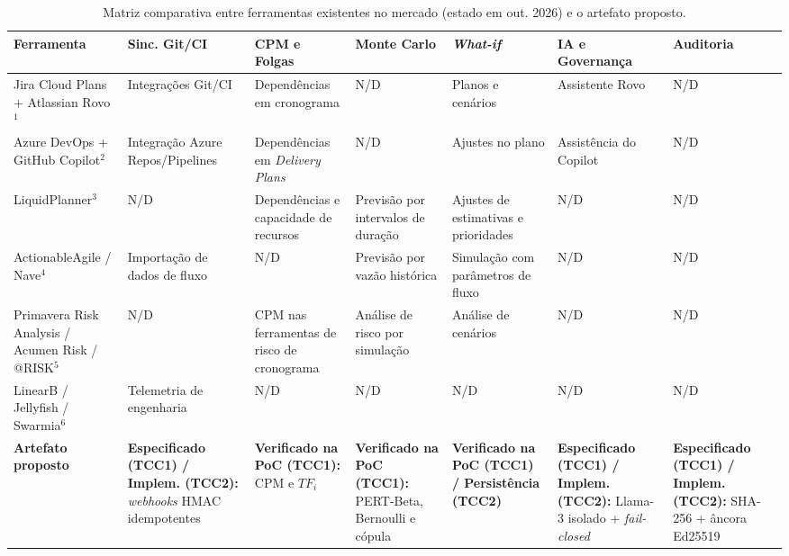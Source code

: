 \documentclass[12pt,openany,oneside,a4paper,english,brazilian,sumario=tradicional]{abntex2}
\begin{document}
\begin{table}[htbp]
\caption{Matriz comparativa entre ferramentas existentes no mercado (estado em out. 2026) e o artefato proposto.}\label{tab:ferramentas}
{\scriptsize
\setlength{\tabcolsep}{2.5pt}
\begin{tabularx}{\textwidth}{L{2.2cm} Y Y Y Y Y Y}
\toprule
\textbf{Ferramenta} & \textbf{Sinc. Git/CI} & \textbf{CPM e Folgas} & \textbf{Monte Carlo} & \textbf{\textit{What-if}} & \textbf{IA e Governança} & \textbf{Auditoria}\\
\midrule
Jira Cloud Plans + Atlassian Rovo$^1$ & Integrações Git/CI & Dependências em cronograma & N/D & Planos e cenários & Assistente Rovo & N/D\\
Azure DevOps + GitHub Copilot$^2$ & Integração Azure Repos/Pipelines & Dependências em \textit{Delivery Plans} & N/D & Ajustes no plano & Assistência do Copilot & N/D\\
LiquidPlanner$^3$ & N/D & Dependências e capacidade de recursos & Previsão por intervalos de duração & Ajustes de estimativas e prioridades & N/D & N/D\\
Actionable\allowbreak Agile / Nave$^4$ & Importação de dados de fluxo & N/D & Previsão por vazão histórica & Simulação com parâmetros de fluxo & N/D & N/D\\
Primavera Risk Analysis / Acumen Risk / @RISK$^5$ & N/D & CPM nas ferramentas de risco de cronograma & Análise de risco por simulação & Análise de cenários & N/D & N/D\\
LinearB / Jellyfish / Swarmia$^6$ & Telemetria de engenharia & N/D & N/D & N/D & N/D & N/D\\
\textbf{Artefato proposto} & \textbf{Especificado (TCC1) / Implem. (TCC2):} \textit{webhooks} HMAC idempotentes & \textbf{Verificado na PoC (TCC1):} CPM e $TF_i$ & \textbf{Verificado na PoC (TCC1):} PERT-Beta, Bernoulli e cópula & \textbf{Verificado na PoC (TCC1) / Persistência (TCC2)} & \textbf{Especificado (TCC1) / Implem. (TCC2):} Llama-3 isolado + \textit{fail-closed} & \textbf{Especificado (TCC1) / Implem. (TCC2):} SHA-256 + âncora Ed25519\\
\bottomrule
\end{tabularx}}
\par{}

\end{table}
\end{document}
